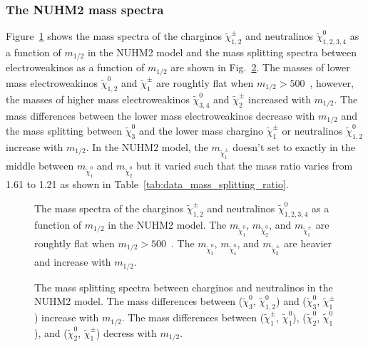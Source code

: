 \subsubsection{The NUHM2 mass spectra}
\label{subsubsec:data_NUHM2_mass_spectra}
Figure~\ref{fig:data_mass_spectra} shows the mass spectra of the charginos $\widetilde{\chi}^{\pm}_{1,2}$ and neutralinos $\widetilde{\chi}^{0}_{1,2,3,4}$ as a function of $m_{1/2}$ in the NUHM2 model and the mass splitting spectra between electroweakinos as a function of $m_{1/2}$ are shown in Fig.~\ref{fig:data_mass_splitting_spectra}.
The masses of lower mass electroweakinos $\widetilde{\chi}^{0}_{1,2}$ and $\widetilde{\chi}^{\pm}_{1}$ are roughtly flat when $m_{1/2} > 500$~{\GeV}, however, the masses of higher mass electroweakinos $\widetilde{\chi}^{0}_{3,4}$ and $\widetilde{\chi}^{\pm}_{2}$ increased with $m_{1/2}$.
The mass differences between the lower mass electroweakinos decrease with $m_{1/2}$ and the mass splitting between $\widetilde{\chi}^{0}_{3}$ and the lower mass chargino $\widetilde{\chi}^{\pm}_{1}$ or neutralinos $\widetilde{\chi}^{0}_{1,2}$ increase with $m_{1/2}$.
In the NUHM2 model, the $m_{\widetilde{\chi}^{\pm}_{1}}$ doesn't set to exactly in the middle between $m_{\widetilde{\chi}^{0}_{1}}$ and $m_{\widetilde{\chi}^{0}_{2}}$ but it varied such that the mass ratio varies from 1.61 to 1.21 as shown in Table~\ref{tab:data_mass_splitting_ratio}.

\begin{figure}[htbp]
    \begin{center}
        \caption{The mass spectra of the charginos $\widetilde{\chi}^{\pm}_{1,2}$ and neutralinos $\widetilde{\chi}^{0}_{1,2,3,4}$ as a function of $m_{1/2}$ in the NUHM2 model.
        The $m_{\widetilde{\chi}^{0}_{1}}$, $m_{\widetilde{\chi}^{0}_{2}}$, and $m_{\widetilde{\chi}^{\pm}_{1}}$ are roughtly flat when $m_{1/2} > 500$~{\GeV}.
        The $m_{\widetilde{\chi}^{0}_{3}}$, $m_{\widetilde{\chi}^{0}_{4}}$, and $m_{\widetilde{\chi}^{\pm}_{2}}$ are heavier and increase with $m_{1/2}$.}
        \label{fig:data_mass_spectra}
    \end{center}
\end{figure}

\begin{figure}[htbp]
    \begin{center}
        \caption{The mass splitting spectra between charginos and neutralinos in the NUHM2 model.
        The mass differences between ($\widetilde{\chi}^{0}_{3}$, $\widetilde{\chi}^{0}_{1,2}$) and ($\widetilde{\chi}^{0}_{3}$, $\widetilde{\chi}^{\pm}_{1}$) increase with $m_{1/2}$.
        The mass differences between ($\widetilde{\chi}^{\pm}_{1}$, $\widetilde{\chi}^{0}_{1}$), ($\widetilde{\chi}^{0}_{2}$, $\widetilde{\chi}^{0}_{1}$), and ($\widetilde{\chi}^{0}_{2}$, $\widetilde{\chi}^{\pm}_{1}$) decress with $m_{1/2}$.}
        \label{fig:data_mass_splitting_spectra}
    \end{center}
\end{figure}

